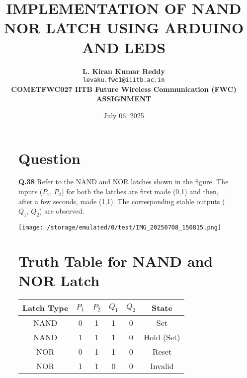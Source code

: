 \documentclass[12pt,a4paper]{article}
\title{\textbf{IMPLEMENTATION OF NAND NOR LATCH USING ARDUINO AND LEDS}}
\author{
\begin{tabular}{c}
\hspace{-5cm}\textbf{L. Kiran Kumar Reddy} \\
\hspace{-5cm}\texttt{levaku.fwc1@iiitb.ac.in} \\
\textbf{\hspace{-2cm}COMETFWC027  IITB Future Wireless Communication (FWC) ASSIGNMENT}
\end{tabular}
}
\date{July 06, 2025}
\begin{document}
\maketitle


\begin{figure}[H]
  \centering
  \begin{minipage}[t]{0.48\textwidth}
    \section*{Question}
    \small
    \noindent\textbf{Q.38} \quad Refer to the NAND and NOR latches shown in the figure. The inputs ($P_1$, $P_2$) for both the latches are first made (0,1) and then, after a few seconds, made (1,1). The corresponding stable outputs ($Q_1$, $Q_2$) are observed.

    \vspace{0.3cm}
    \texttt{[image: /storage/emulated/0/test/IMG\_20250708\_150815.png]} 

    \vspace{0.5cm}
    \section*{Truth Table for NAND and NOR Latch}
    \renewcommand{\arraystretch}{1.3}
    \begin{tabular}{|c|c|c|c|c|c|}
      \hline
      \textbf{Latch Type} & \textbf{$P_1$} & \textbf{$P_2$} & \textbf{$Q_1$} & \textbf{$Q_2$} & \textbf{State} \\
      \hline
      NAND & 0 & 1 & 1 & 0 & Set \\
      NAND & 1 & 1 & 1 & 0 & Hold (Set) \\
      \hline
      NOR & 0 & 1 & 1 & 0 & Reset \\
      NOR & 1 & 1 & 0 & 0 & Invalid \\
      \hline
    \end{tabular}
  \end{minipage}\hfill
  \begin{minipage}[t]{0.48\textwidth}

\end{minipage}
\end{figure}
\end{document}
